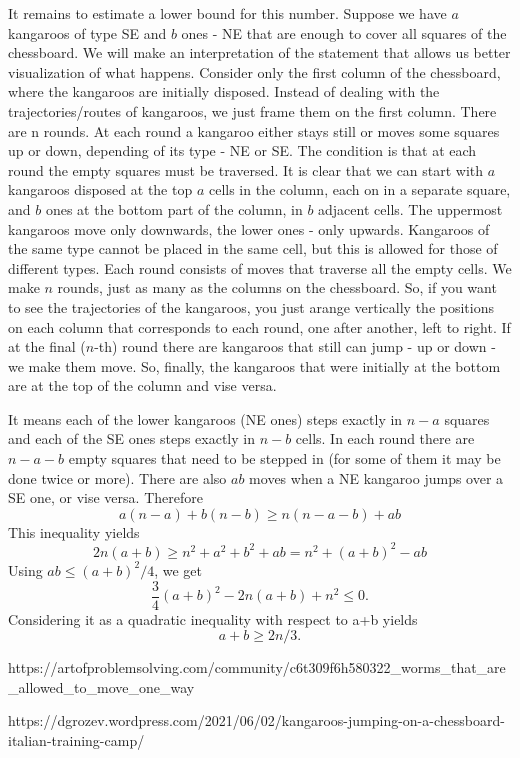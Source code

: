 \documentclass[a4paper]{article}
\begin{document}
\begin{question*}{}
{        It remains to estimate a lower bound for this number. Suppose we have $a$ kangaroos of type SE and $b$ ones - NE that are enough to cover all squares of the chessboard. We will make an interpretation of the statement that allows us better visualization of what happens. Consider only the first column of the chessboard, where the kangaroos are initially disposed. Instead of dealing with the trajectories/routes of kangaroos, we just frame them on the first column. There are n rounds. At each round a kangaroo either stays still or moves some squares up or down, depending of its type - NE or SE. The condition is that at each round the empty squares must be traversed. It is clear that we can start with $a$ kangaroos disposed at the top $a$ cells in the column, each on in a separate square, and $b$ ones at the bottom part of the column, in $b$ adjacent cells. The uppermost kangaroos move only downwards, the lower ones - only upwards. Kangaroos of the same type cannot be placed in the same cell, but this is allowed for those of different types. Each round consists of moves that traverse all the empty cells. We make $n$ rounds, just as many as the columns on the chessboard. So, if you want to see the trajectories of the kangaroos, you just arange vertically the positions on each column that corresponds to each round, one after another, left to right. If at the final ($n$-th) round there are kangaroos that still can jump - up or down - we make them move. So, finally, the kangaroos that were initially at the bottom are at the top of the column and vise versa. 

        It means each of the lower kangaroos (NE ones) steps exactly in $n-a$ squares and each of the SE ones steps exactly in $n-b$ cells. In each round there are $n-a-b$ empty squares that need to be stepped in (for some of them it may be done twice or more). There are also $ab$ moves when a NE kangaroo jumps over a SE one, or vise versa. Therefore
        \[\displaystyle a(n-a)+b(n-b)\ge n(n-a-b)+ab \]
        This inequality yields
        \[\displaystyle 2n(a+b)\ge n^2+a^2+b^2+ab=n^2+(a+b)^2-ab\]
        Using $ab\leq (a+b)^2/4$, we get
        \[\displaystyle \frac{3}{4}(a+b)^2-2n(a+b)+n^2\le 0.\]
        Considering it as a quadratic inequality with respect to a+b yields
        \[a+b\ge 2n/3.\]
        }{%
        https://artofproblemsolving.com/community/c6t309f6h580322_worms_that_are_allowed_to_move_one_way

        https://dgrozev.wordpress.com/2021/06/02/kangaroos-jumping-on-a-chessboard-italian-training-camp/
    }


\end{question*}
\end{document}
